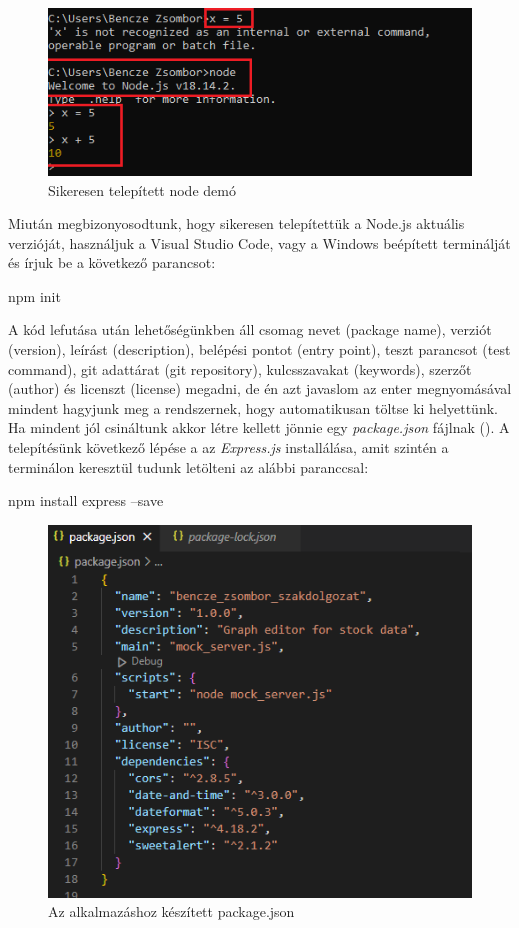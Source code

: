 \begin{figure}[h]
\centering
\includegraphics[scale=0.9]{images/nodeTest.png}
\caption{Sikeresen telepített node demó}
\label{fig:node}
\end{figure}

Miután megbizonyosodtunk, hogy sikeresen telepítettük a Node.js aktuális verzióját, használjuk a Visual Studio Code, vagy a Windows beépített terminálját és írjuk be a következő parancsot:
\begin{cpp}
npm init
\end{cpp} 
A kód lefutása után lehetőségünkben áll csomag nevet (package name), verziót (version), leírást (description), belépési pontot (entry point), teszt parancsot (test command), git adattárat (git repository), kulcsszavakat (keywords), szerzőt (author) és licenszt (license) megadni, de én azt javaslom az enter megnyomásával mindent hagyjunk meg a rendszernek, hogy automatikusan töltse ki helyettünk. Ha mindent jól csináltunk akkor létre kellett jönnie egy \emph{package.json} fájlnak (). A telepítésünk következő lépése a az \emph{Express.js} installálása, amit szintén a terminálon keresztül tudunk letölteni az alábbi paranccsal:
\begin{cpp}
npm install express --save
\end{cpp}

\begin{figure}[h]
\centering
\includegraphics[scale=0.9]{images/packageJSON.png}
\caption{Az alkalmazáshoz készített package.json }
\label{fig:package}
\end{figure}

